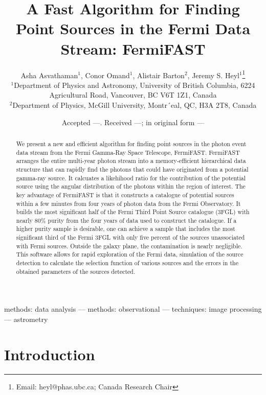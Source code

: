 \documentclass[useAMS,usenatbib]{mn2e}
\title[FermiFAST]{A Fast Algorithm for Finding Point Sources
in the Fermi Data Stream: FermiFAST}
\author[A. Asvathaman {\em et al.}]{Asha Asvathaman$^{1}$, Conor Omand$^{1}$, Alistair Barton$^{2}$,
  Jeremy S. Heyl$^{1}$\thanks{Email: heyl@phas.ubc.ca; Canada Research Chair} \\
$^{1}$Department of Physics and Astronomy, University of British
  Columbia, 6224 Agricultural Road, Vancouver, BC V6T 1Z1, Canada\\
$^{2}$Department of Physics, McGill University, Montr´eal, QC, H3A 2T8, Canada}
\begin{document}
\date{Accepted ---. Received ---; in original form ---}

\pagerange{\pageref{firstpage}--\pageref{lastpage}} 

\maketitle

\label{firstpage}

\begin{abstract}
We present a new and efficient algorithm for finding point sources in
the photon event data stream from the Fermi Gamma-Ray Space Telescope,
FermiFAST.  FermiFAST arranges the entire multi-year photon stream
into a memory-efficient hierarchical data structure that can rapidly
find the photons that could have originated from a potential gamma-ray
source.  It calcuates a likehihood ratio for the contribution of the
potential source using the angular distribution of the photons within
the region of interest.  The key advantage of FermiFAST is that it
constructs a catalogue of potential sources within a few minutes from
four years of photon data from the Fermi Observatory.  It builds the
most significant half of the Fermi Third Point Source catalogue (3FGL)
with nearly 80\% purity from the four years of data used to construct
the catalogue.  If a higher purity sample is desirable, one can
achieve a sample that includes the most significant third of the Fermi
3FGL with only five percent of the sources unassociated with Fermi
sources.  Outside the galaxy plane, the contamination is nearly
negligible.  This software allows for rapid exploration of the Fermi
data, simulation of the source detection to calculate the selection
function of various sources and the errors in the obtained parameters
of the sources detected.
\end{abstract}

\begin{keywords}
methods: data analysis --- methods: observational --- techniques:
image processing --- astrometry
\end{keywords}

\section{Introduction}
\end{document}
